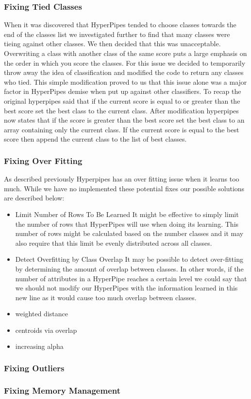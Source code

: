 \subsubsection{Fixing Tied Classes}
When it was discovered that HyperPipes tended to choose classes 
towards the end of the classes list we investigated further to 
find that many classes were tieing against other classes. We 
then decided that this was unacceptable. Overwriting a class 
with another class of the same score puts a large emphasis on 
the order in which you score the classes. For this issue we 
decided to temporarily throw away the idea of classification 
and modified the code to return any classes who tied. This 
simple modification proved to us that this issue alone was a 
major factor in HyperPipes demise when put up against other 
classifiers. To recap the original hyperpipes said that if 
the current score is equal to or greater than the best score 
set the best class to the current class. After modification 
hyperpipes now states that if the score is greater than the 
best score set the best class to an array containing only the 
current class. If the current score is equal to the best score 
then append the current class to the list of best classes.
\subsubsection{Fixing Over Fitting}
As described previously Hyperpipes has an over fitting issue 
when it learns too much. While we have no implemented these 
potential fixes our possible solutions are described below:
\begin{itemize}
	\item{Limit Number of Rows To Be Learned}
	It might be effective to simply limit the number of rows 
	that HyperPipes will use when doing its learning. This 
	number of rows might be calculated based on the number 
	classes and it may also require that this limit be 
	evenly distributed across all classes.
	\item{Detect Overfitting by Class Overlap}
	It may be possible to detect over-fitting by determining 
	the amount of overlap between classes. In other words, 
	if the number of attributes in a HyperPipe reaches a 
	certain level we could say that we should not modify our 
	HyperPipes with the information learned in this new line
	as it would cause too much overlap between classes.
	\item{weighted distance}
	\item{centroids via overlap}
	\item{increasing alpha}
\end{itemize}
\subsubsection{Fixing Outliers}
\subsubsection{Fixing Memory Management}
